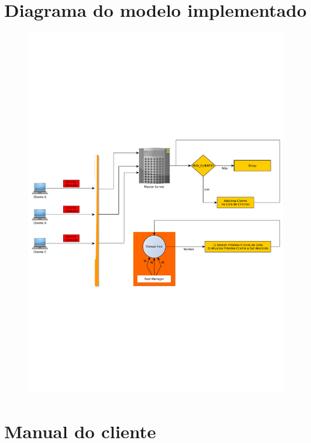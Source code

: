 \lstset{breaklines=true}	%

\section{Diagrama do modelo implementado\label{app:diag}}

	\begin{figure}
		\centering
		\includegraphics[clip,trim=0cm 5.5cm 0cm 5.5cm,width=0.7\textheight]{Img/AppSchematic}
	\end{figure}

\clearpage
\section{Manual do cliente\label{app:manC}}

